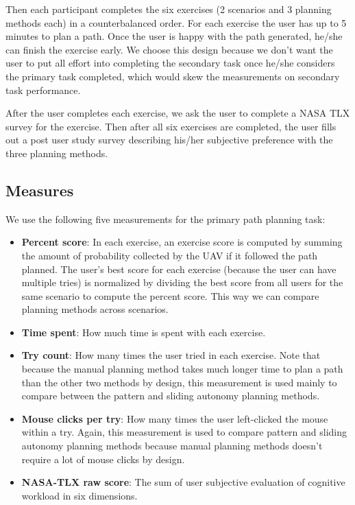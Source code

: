 \documentclass[journal]{IEEEtran}
\begin{document}
Then each participant completes the six exercises (2 scenarios and 3 planning methods each) in a counterbalanced order. For each exercise the user has up to 5 minutes to plan a path. Once the user is happy with the path generated, he/she can finish the exercise early. We choose this design because we don't want the user to put all effort into completing the secondary task once he/she considers the primary task completed, which would skew the measurements on secondary task performance.

After the user completes each exercise, we ask the user to complete a NASA TLX survey for the exercise. Then after all six exercises are completed, the user fills out a post user study survey describing his/her subjective preference with the three planning methods.

\subsection{Measures}

We use the following five measurements for the primary path planning task:

\begin{itemize}
\item \textbf{Percent score}: In each exercise, an exercise score is computed by summing the amount of probability collected by the UAV if it followed the path planned. The user's best score for each exercise (because the user can have multiple tries) is normalized by dividing the best score from all users for the same scenario to compute the percent score. This way we can compare planning methods across scenarios.
\item \textbf{Time spent}: How much time is spent with each exercise.
\item \textbf{Try count}: How many times the user tried in each exercise. Note that because the manual planning method takes much longer time to plan a path than the other two methods by design, this measurement is used mainly to compare between the pattern and sliding autonomy planning methods.
\item \textbf{Mouse clicks per try}: How many times the user left-clicked the mouse within a try. Again, this measurement is used to compare pattern and sliding autonomy planning methods because manual planning methods doesn't require a lot of mouse clicks by design.
\item \textbf{NASA-TLX raw score}: The sum of user subjective evaluation of cognitive workload in six dimensions. 
\end{itemize}
\end{document}
